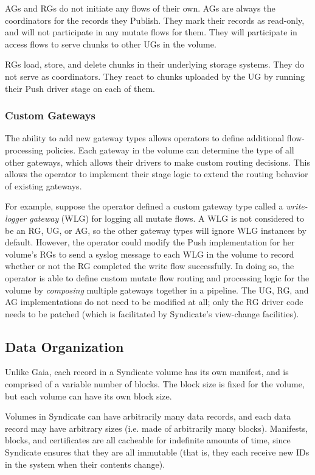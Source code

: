 AGs and RGs do not initiate any flows of
their own.  AGs are always the coordinators for the records they Publish.  They mark their
records as read-only, and will not participate in any mutate flows for them.
They will participate in access flows to serve chunks to other UGs in the volume.

RGs load, store, and delete chunks in their underlying storage systems.  They do
not serve as coordinators.  They react to chunks uploaded by the UG by running
their Push driver stage on each of them.

\subsubsection{Custom Gateways}

The ability to add new gateway types allows operators to define additional
flow-processing policies.  Each gateway in the volume can determine the type of
all other gateways, which allows their drivers to make custom routing decisions.
This allows the operator to implement their stage logic to extend the
routing behavior of existing gateways.

For example, suppose the operator defined a custom gateway
type called a \emph{write-logger gateway} (WLG) for logging all mutate flows.
A WLG is not considered to be
an RG, UG, or AG, so the other gateway types will ignore WLG instances by
default.  However, the operator could modify the Push implementation for
her volume's RGs to send a syslog message to each WLG in the volume to record
whether or not the RG completed the write flow successfully.  In doing so, the
operator is able to define custom mutate flow routing and processing
logic for the volume by \emph{composing} multiple gateways together in a
pipeline.  The UG, RG, and AG implementations do not need to be modified at all;
only the RG driver code needs to be patched (which is facilitated by Syndicate's
view-change facilities).

\subsection{Data Organization}

Unlike Gaia, each record in a Syndicate volume has its own manifest, and is
comprised of a variable number of blocks.  The block size is fixed for the
volume, but each volume can have its own block size.

Volumes in Syndicate can have arbitrarily many data records, and each data
record may have arbitrary sizes (i.e. made of arbitrarily many blocks).
Manifests, blocks, and certificates are all cacheable for
indefinite amounts of time, since Syndicate ensures that they are all immutable
(that is, they each receive new IDs in the system when their contents change).

